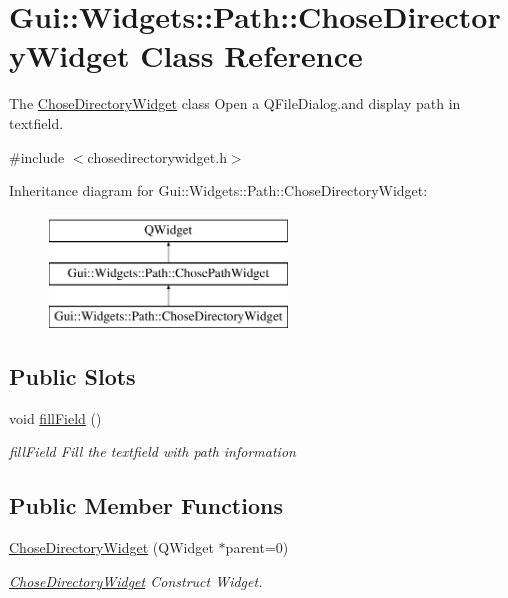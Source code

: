 \hypertarget{classGui_1_1Widgets_1_1Path_1_1ChoseDirectoryWidget}{\section{Gui\-:\-:Widgets\-:\-:Path\-:\-:Chose\-Directory\-Widget Class Reference}
\label{classGui_1_1Widgets_1_1Path_1_1ChoseDirectoryWidget}
}


The \hyperlink{classGui_1_1Widgets_1_1Path_1_1ChoseDirectoryWidget}{Chose\-Directory\-Widget} class Open a Q\-File\-Dialog.\-and display path in textfield.  




{\ttfamily \#include $<$chosedirectorywidget.\-h$>$}

Inheritance diagram for Gui\-:\-:Widgets\-:\-:Path\-:\-:Chose\-Directory\-Widget\-:\begin{figure}[H]
\begin{center}
\leavevmode
\includegraphics[height=3.000000cm]{dd/d67/classGui_1_1Widgets_1_1Path_1_1ChoseDirectoryWidget}
\end{center}
\end{figure}
\subsection*{Public Slots}
\begin{DoxyCompactItemize}
\item 
\hypertarget{classGui_1_1Widgets_1_1Path_1_1ChoseDirectoryWidget_ab20017ce0bf79bb3961b1328ecab6d9e}{void \hyperlink{classGui_1_1Widgets_1_1Path_1_1ChoseDirectoryWidget_ab20017ce0bf79bb3961b1328ecab6d9e}{fill\-Field} ()}\label{classGui_1_1Widgets_1_1Path_1_1ChoseDirectoryWidget_ab20017ce0bf79bb3961b1328ecab6d9e}

\begin{DoxyCompactList}\small\item\em fill\-Field Fill the textfield with path information \end{DoxyCompactList}\end{DoxyCompactItemize}
\subsection*{Public Member Functions}
\begin{DoxyCompactItemize}
\item 
\hyperlink{classGui_1_1Widgets_1_1Path_1_1ChoseDirectoryWidget_aac9ce6a6c6c8322085f42528d99ac830}{Chose\-Directory\-Widget} (Q\-Widget $\ast$parent=0)
\begin{DoxyCompactList}\small\item\em \hyperlink{classGui_1_1Widgets_1_1Path_1_1ChoseDirectoryWidget}{Chose\-Directory\-Widget} Construct Widget. \end{DoxyCompactList}\end{DoxyCompactItemize}
